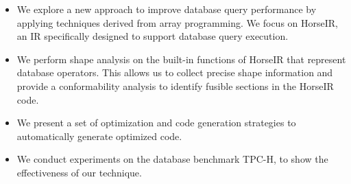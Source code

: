 \begin{itemize}
\item We explore a new approach to improve database query performance by
      applying techniques derived from array programming. We focus on HorseIR, an IR specifically designed to support database query execution.
\item We perform shape analysis on the built-in functions of HorseIR that represent database operators. This allows us to collect precise shape information and provide a conformability analysis to identify fusible sections in the HorseIR code. 
\item We present a set of optimization and code generation strategies to automatically
      generate optimized code.
\item We conduct experiments on the database benchmark TPC-H, to show the effectiveness of our technique.
\end{itemize}


